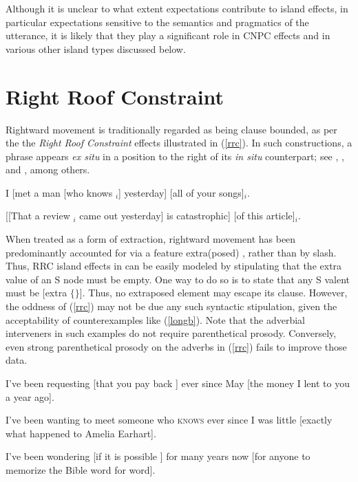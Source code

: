 \documentclass[output=paper]{langsci/langscibook}
\begin{document}
  Although it is unclear to what extent expectations contribute to island effects, in particular expectations sensitive to the semantics and pragmatics of the utterance, it is likely that they play a significant role in CNPC effects and in various other island types discussed below.


\section{Right Roof Constraint}

Rightward movement is traditionally regarded as being clause bounded, as per the 
the {\it Right Roof Constraint}  \citep{Ross67} effects  illustrated in (\ref{rrc}). 
 In such constructions, a phrase appears {\it ex situ} in a position 
to the right of its {\it in situ} counterpart; see   \citet{akma75}, \citet{baltin78}, and  \citet{stowelldiss}, among others.

\ea \label{rrc}
\ea \bad{*}I [met a man [who knows \spc$_i$] yesterday] [all of your songs]$_i$.
\item \bad{*}[[That a review \spc$_i$ came out yesterday] is catastrophic] [of this article]$_i$.
\z
\z

\noindent
When treated as a form of extraction, rightward movement has been predominantly
accounted for via a feature {\sc extra(posed)} \citep{Noord:Bouma:96,eynde96,
kellerverb,KimSag2005}, rather than by {\sc slash}.  
Thus, RRC island effects in can be easily modeled by stipulating that the  {\sc extra} value of an S node must be empty. One way to do so
is to state that any S valent must be [{\sc extra} $\lbrace \rbrace$].
Thus, no extraposed element may escape its clause. However,  the oddness of (\ref{rrc}) may not be due any such syntactic stipulation, given the acceptability of counterexamples like (\ref{longb}). Note that the adverbial interveners in such examples do not  require parenthetical prosody. Conversely, even strong  parenthetical
prosody on the adverbs in (\ref{rrc}) fails to improve those data.


\ea \label{longb}
\ea  I've been requesting [that you pay back \spc] ever since May [the money
I lent to you a year ago].\\
  \citep[251]{kayne00}

\item I've been wanting to meet someone
who \textsc{knows} \spc ever since I was little [exactly what happened to Amelia Earhart].

\item  I've been wondering  [if it is possible   \spc]
for many years now [for anyone to memorize the Bible word for word].\\
\citep[861]{chavesrnr}
\z
\z
\end{document}
